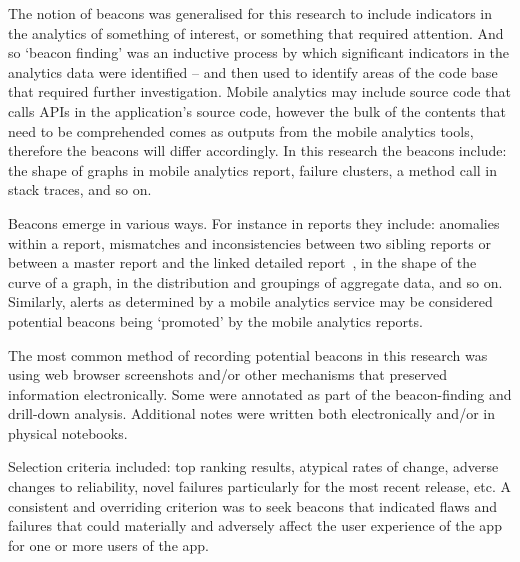 The notion of beacons was generalised for this research to include indicators in the analytics of something of interest, or something that required attention.  And so `beacon finding' was an inductive process by which significant indicators in the analytics data were identified -- and then used to identify areas of the code base that required further investigation.  Mobile analytics may include source code that calls APIs in the application's source code, however the bulk of the contents that need to be comprehended comes as outputs from the mobile analytics tools, therefore the beacons will differ accordingly. In this research the beacons include: the shape of graphs in mobile analytics report, failure clusters, a method call in stack traces, and so on.


\begin{kaobox}[frametitle=Beacons in Mobile Analytics]

\end{kaobox}

Beacons emerge in various ways. For instance in reports they include: anomalies within a report, mismatches and inconsistencies between two sibling reports or between a master report and the linked detailed report~, in the shape of the curve of a graph, in the distribution and groupings of aggregate data, and so on. Similarly, alerts as determined by a mobile analytics service may be considered potential beacons being `promoted' by the mobile analytics reports. 

The most common method of recording potential beacons in this research was using web browser screenshots and/or other mechanisms that preserved information electronically. Some were annotated as part of the beacon-finding and drill-down analysis. Additional notes were written both electronically and/or in physical notebooks. 

Selection criteria included: top ranking results, atypical rates of change, adverse changes to reliability, novel failures particularly for the most recent release, etc. A consistent and overriding criterion was to seek beacons that indicated flaws and failures that could materially and adversely affect the user experience of the app for one or more users of the app.

